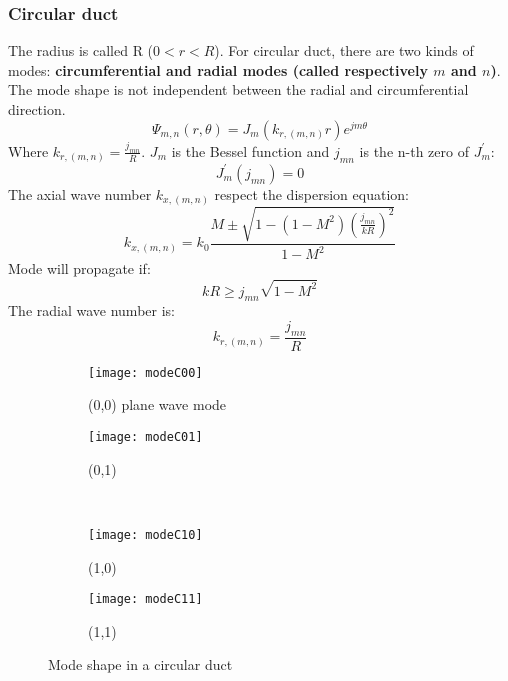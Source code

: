 \subsubsection{Circular duct}
The radius is called R ($0<r<R$).
For circular duct, there are two kinds of modes: \textbf{circumferential and radial modes (called respectively $m$ and $n$)}. The mode shape is not independent between the radial and circumferential direction. 
\begin{equation} 
    \Psi_{m,n}(r,\theta)=J_m(k_{r,(m,n)} r)e^{jm\theta}
\end{equation}
Where $k_{r,(m,n)}=\frac{j_{mn}}{R}$. $J_m$ is the Bessel function and $j_{mn}$ is the n-th zero of $J_m^'$:
\begin{equation} 
    J_m^'(j_{mn})=0
\end{equation}
The axial wave number $k_{x,(m,n)}$ respect the dispersion equation: 
\begin{equation} 
    k_{x,(m,n)}=k_0\frac{M\pm\sqrt{1-(1-M^2)(\frac{j_{mn}}{kR})^2}}{1-M^2}
\end{equation}
Mode will propagate if:
\begin{equation} 
    kR\geq j_{mn}\sqrt{1-M^2}
\end{equation}
The radial wave number is: 
\begin{equation} 
    k_{r,(m,n)}=\frac{j_{mn}}{R}
\end{equation}
\begin{figure}[H] \centering
    \begin{subfigure}{.5\textwidth}\centering
     \texttt{[image: modeC00]}
     \caption{(0,0) plane wave mode}
    \end{subfigure}%
    \begin{subfigure}{.5\textwidth}\centering
     \texttt{[image: modeC01]}
     \caption{(0,1)}
    \end{subfigure}\\
    \begin{subfigure}{.5\textwidth}\centering
     \texttt{[image: modeC10]}
     \caption{(1,0)}
    \end{subfigure}%
    \begin{subfigure}{.5\textwidth}\centering
     \texttt{[image: modeC11]}
     \caption{(1,1)}
    \end{subfigure}
    \caption{Mode shape in a circular duct}
\end{figure}
